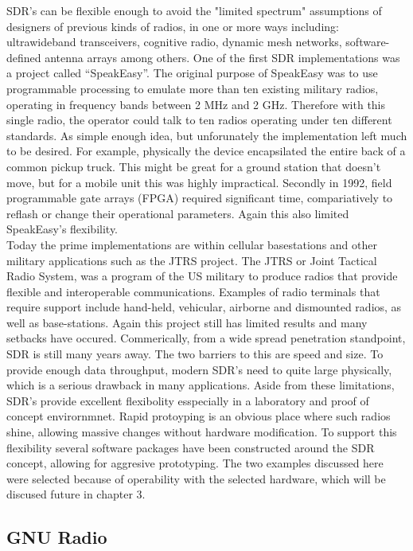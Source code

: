 SDR's can be flexible enough to avoid the "limited spectrum" assumptions of designers of previous kinds of radios, in one or more ways including: ultrawideband transceivers, cognitive radio, dynamic mesh networks, software-defined antenna arrays among others\cite{22}.  One of the first SDR implementations was a project called ``SpeakEasy''.  The original purpose of SpeakEasy was to use programmable processing to emulate more than ten existing military radios, operating in frequency bands between 2 MHz and 2 GHz\cite{23}.  Therefore with this single radio, the operator could talk to ten radios operating under ten different standards.  As simple enough idea, but unforunately the implementation left much to be desired.  For example, physically the device encapsilated the entire back of a common pickup truck\cite{23}.  This might be great for a ground station that doesn't move, but for a mobile unit this was highly impractical.  Secondly in 1992, field programmable gate arrays (FPGA) required significant time, compariatively to reflash or change their operational parameters.  Again this also limited SpeakEasy's flexibility.\\

Today the prime implementations are within cellular basestations and other military applications such as the JTRS project.  The JTRS or  Joint Tactical Radio System, was a program of the US military to produce radios that provide flexible and interoperable communications. Examples of radio terminals that require support include hand-held, vehicular, airborne and dismounted radios, as well as base-stations\cite{24}.  Again this project still has limited results and many setbacks have occured.  Commerically, from a wide spread penetration standpoint, SDR is still many years away.  The two barriers to this are speed and size.  To provide enough data throughput, modern SDR's need to quite large physically, which is a serious drawback in many applications.   Aside from these limitations, SDR's provide excellent flexibolity esspecially in a laboratory and proof of concept envirornmnet.  Rapid protoyping is an obvious place where such radios shine, allowing massive changes without hardware modification.  To support this flexibility several software packages have been constructed around the SDR concept, allowing for aggresive prototyping.  The two examples discussed here were selected because of operability with the selected hardware, which will be discused future in chapter 3.\\

\subsection{GNU Radio}

